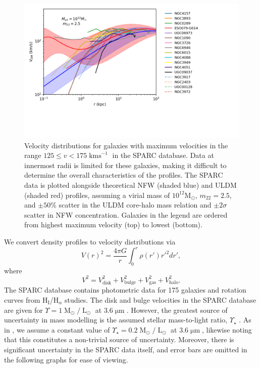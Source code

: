 \documentclass{pasa}%
\begin{document}
\begin{figure}[t]
\centering
\includegraphics[scale=0.9, trim={0cm 2.5cm 3cm 0cm}]{000_vs_SPARC_10_12.png}
\caption{Velocity distributions for galaxies with maximum velocities in the range $125 \leq v < 175\operatorname{kms}^{-1}$ in the SPARC database. Data at innermost radii is limited for these galaxies, making it difficult to determine the overall characteristics of the profiles. The SPARC data is plotted alongside theoretical NFW (shaded blue) and ULDM (shaded red) profiles, assuming a virial mass of $10^{12} \mathrm{M}_{\odot}$, $m_{22} = 2.5$, and $\pm 50 \%$ scatter in the ULDM core-halo mass relation and $\pm2\sigma$ scatter in NFW concentration. Galaxies in the legend are ordered from highest maximum velocity (top) to lowest (bottom).}\label{fig:high_v} 
\end{figure}

We convert  density profiles to velocity distributions \cite{Sofue:2008wt} via 
%
\begin{equation}
    V(r)^2 = \frac{4\pi G}{r}\int_0^r \rho(r')r'^2 dr',
\end{equation}
where 
\begin{equation}\label{eq:vel_decomp}
    V^2 = V_{\mathrm{disk}}^2 + V_{\mathrm{bulge}}^2 + V_{\mathrm{gas}}^2 + V_{\mathrm{halo}}^2.
\end{equation}
%
The SPARC database contains photometric data for 175 galaxies and rotation curves from $\mathrm{H}_{\mathrm{I}}$/$\mathrm{H}_{\alpha}$ studies. The disk and bulge velocities in the SPARC database are given for $\Upsilon = 1 \operatorname{M}_{\odot}/\operatorname{L}_{\odot}$ at $3.6\operatorname{\mu m}$. However, the greatest source of uncertainty in mass modelling is the assumed stellar mass-to-light ratio, $\Upsilon_\star$ \cite{Lelli:2016zqa}. As in \cite{Robles:2018fur}, we  assume a constant value of $\Upsilon_\star = 0.2 \operatorname{M}_{\odot}/\operatorname{L}_{\odot}$ at $3.6\operatorname{\mu m}$, likewise noting that  this constitutes a non-trivial source of uncertainty. Moreover, there is significant uncertainty in the SPARC data itself, and error bars are omitted in the following graphs for ease of viewing. 
\end{document}
